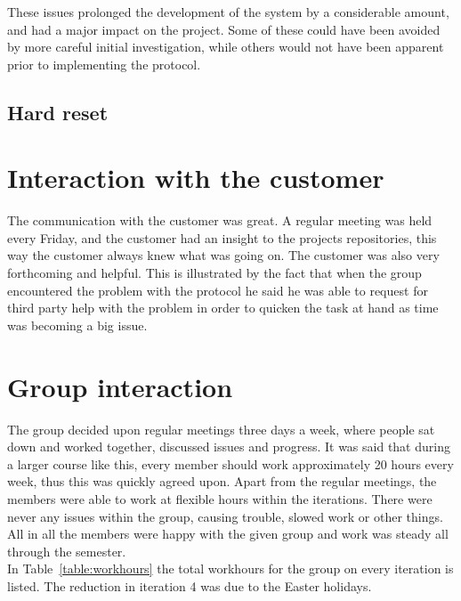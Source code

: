 	These issues prolonged the development of the system by a considerable amount, and had a major impact on the project. Some
	of these could have been avoided by more careful initial investigation, while others would not have been apparent prior to implementing the protocol.

	\subsection{Hard reset}
	\label{hard-reset}

\section{Interaction with the customer}

	The communication with the customer was great. A regular meeting was held every Friday, and the customer had an insight to the projects repositories, this way the customer always knew what was going on. The customer was also very forthcoming and helpful. This is illustrated by the fact that when the group encountered the problem with the protocol he said he was able to request for third party help with the problem in order to quicken the task at hand as time was becoming a big issue. 



\section{Group interaction}
	The group decided upon regular meetings three days a week, where people sat down and worked together, discussed issues and progress. It was said that during a larger course like this, every member should work approximately 20 hours every week, thus this was quickly agreed upon. Apart from the regular meetings, the members were able to work at flexible hours within the iterations. There were never any issues within the group, causing trouble, slowed work or other things. All in all the members were happy with the given group and work was steady all through the semester.\\ 
	In Table~\ref{table:workhours} the total workhours for the group on every iteration is listed. The reduction in iteration 4 was due to the Easter holidays.


